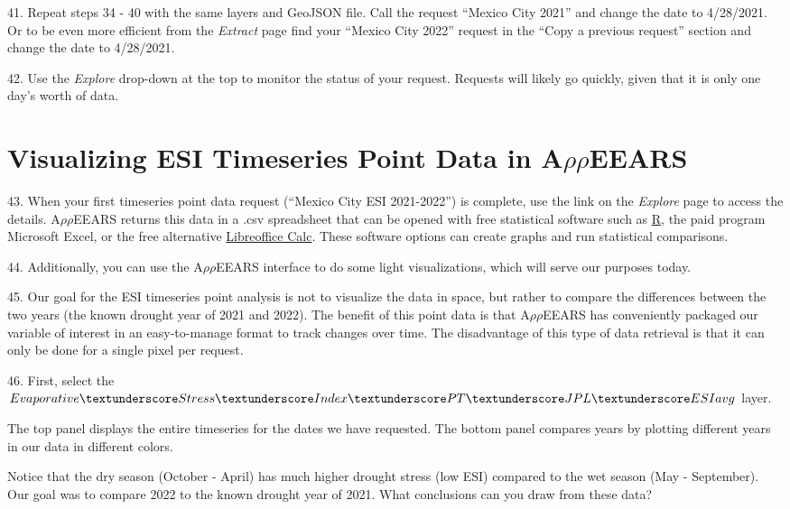 \documentclass[oneside,a4paper,11pt,explicit]{book}
\begin{document}
41. Repeat steps 34 - 40 with the same layers and GeoJSON file. Call the request ``Mexico City 2021'' and change the date to 4/28/2021. Or to be even more efficient from the \textit{Extract} page find your ``Mexico City 2022'' request in the ``Copy a previous request'' section and change the date to 4/28/2021.

42. Use the \textit{Explore} drop-down at the top to monitor the status of your request. Requests will likely go quickly, given that it is only one day's worth of data.

\section{Visualizing ESI Timeseries Point Data in A$\rho\rho$EEARS}

43. When your first timeseries point data request (``Mexico City ESI 2021-2022'') is complete, use the link on the \textit{Explore} page to access the details. A$\rho\rho$EEARS returns this data in a .csv spreadsheet that can be opened with free statistical software such as \href{https://www.r-project.org/about.html}{R}, the paid program Microsoft Excel, or the free alternative \href{https://www.libreoffice.org/}{Libreoffice Calc}. These software options can create graphs and run statistical comparisons. 

44. Additionally, you can use the A$\rho\rho$EEARS interface to do some light visualizations, which will serve our purposes today.

45. Our goal for the ESI timeseries point analysis is not to visualize the data in space, but rather to compare the differences between the two years (the known drought year of 2021 and 2022). The benefit of this point data is that A$\rho\rho$EEARS has conveniently packaged our variable of interest in an easy-to-manage format to track changes over time. The disadvantage of this type of data retrieval is that it can only be done for a single pixel per request. 

46. First, select the $Evaporative\textunderscore Stress\textunderscore Index\textunderscore PT\textunderscore JPL\textunderscore ESIavg$ layer.


The top panel displays the entire timeseries for the dates we have requested. The bottom panel compares years by plotting different years in our data in different colors. 

\vspace{.5em}

Notice that the dry season (October - April) has much higher drought stress (low ESI) compared to the wet season (May - September). Our goal was to compare 2022 to the known drought year of 2021. What conclusions can you draw from these data? 
\end{document}
